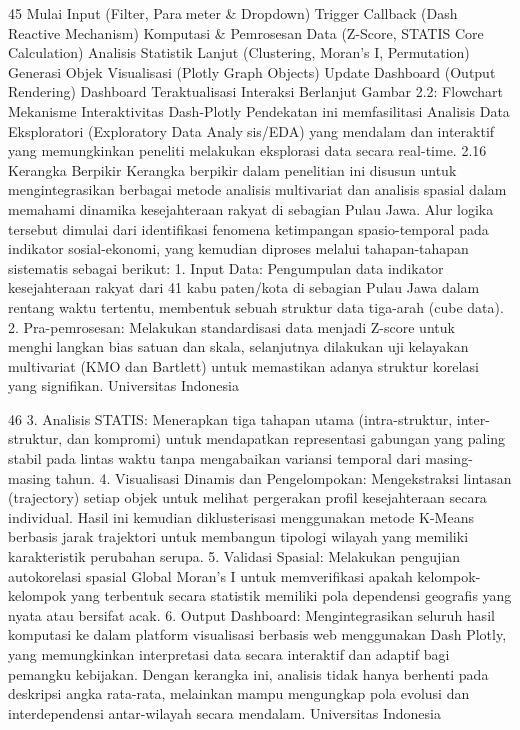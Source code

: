 45
Mulai
Input (Filter, Parameter & Dropdown)
Trigger Callback
(Dash Reactive Mechanism)
Komputasi & Pemrosesan Data
(Z-Score, STATIS Core Calculation)
Analisis Statistik Lanjut
(Clustering, Moran’s I, Permutation)
Generasi Objek Visualisasi
(Plotly Graph Objects)
Update Dashboard
(Output Rendering)
Dashboard Teraktualisasi
Interaksi
Berlanjut
Gambar 2.2: Flowchart Mekanisme Interaktivitas Dash-Plotly
Pendekatan ini memfasilitasi Analisis Data Eksploratori (Exploratory Data Analysis/EDA) yang mendalam dan interaktif yang memungkinkan peneliti melakukan eksplorasi
data secara real-time.
2.16 Kerangka Berpikir
Kerangka berpikir dalam penelitian ini disusun untuk mengintegrasikan berbagai
metode analisis multivariat dan analisis spasial dalam memahami dinamika kesejahteraan
rakyat di sebagian Pulau Jawa. Alur logika tersebut dimulai dari identifikasi fenomena
ketimpangan spasio-temporal pada indikator sosial-ekonomi, yang kemudian diproses
melalui tahapan-tahapan sistematis sebagai berikut:
1. Input Data: Pengumpulan data indikator kesejahteraan rakyat dari 41 kabupaten/kota di sebagian Pulau Jawa dalam rentang waktu tertentu, membentuk sebuah
struktur data tiga-arah (cube data).
2. Pra-pemrosesan: Melakukan standardisasi data menjadi Z-score untuk menghilangkan bias satuan dan skala, selanjutnya dilakukan uji kelayakan multivariat (KMO
dan Bartlett) untuk memastikan adanya struktur korelasi yang signifikan.
Universitas Indonesia

46
3. Analisis STATIS: Menerapkan tiga tahapan utama (intra-struktur, inter-struktur, dan
kompromi) untuk mendapatkan representasi gabungan yang paling stabil pada lintas
waktu tanpa mengabaikan variansi temporal dari masing-masing tahun.
4. Visualisasi Dinamis dan Pengelompokan: Mengekstraksi lintasan (trajectory)
setiap objek untuk melihat pergerakan profil kesejahteraan secara individual. Hasil
ini kemudian diklusterisasi menggunakan metode K-Means berbasis jarak trajektori
untuk membangun tipologi wilayah yang memiliki karakteristik perubahan serupa.
5. Validasi Spasial: Melakukan pengujian autokorelasi spasial Global Moran’s I untuk
memverifikasi apakah kelompok-kelompok yang terbentuk secara statistik memiliki
pola dependensi geografis yang nyata atau bersifat acak.
6. Output Dashboard: Mengintegrasikan seluruh hasil komputasi ke dalam platform
visualisasi berbasis web menggunakan Dash Plotly, yang memungkinkan interpretasi
data secara interaktif dan adaptif bagi pemangku kebijakan.
Dengan kerangka ini, analisis tidak hanya berhenti pada deskripsi angka rata-rata,
melainkan mampu mengungkap pola evolusi dan interdependensi antar-wilayah secara
mendalam.
Universitas Indonesia

